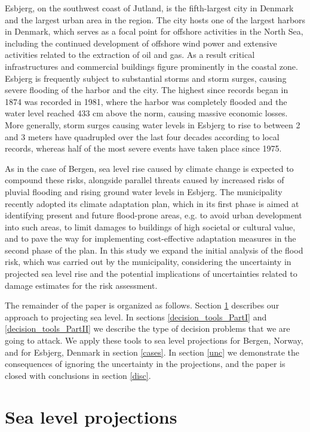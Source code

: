 \documentclass[note,screen,british,11pt]{nrdoc}
\begin{document}
Esbjerg, on the southwest coast of Jutland, is the fifth-largest city in Denmark and the largest urban area in the region. The city hosts one of the largest harbors  in Denmark, which serves as a focal point for offshore activities in the North Sea, including the continued development of offshore wind power and extensive activities related to the extraction of oil and gas. As a result critical infrastructures and commercial buildings figure prominently in the coastal zone. Esbjerg is frequently subject to substantial storms and storm surges, causing severe flooding of the harbor and the city. The highest since records began in 1874 was recorded in 1981, where the harbor was completely flooded and the water level reached  433 cm above the norm, causing massive economic losses.  More generally, storm surges causing water levels in Esbjerg to rise to between 2 and 3 meters have quadrupled over the last four decades according to local records, whereas half of the most severe events have taken place since 1975.

As in the case of Bergen, sea level rise caused by climate change is expected to compound these risks, alongside parallel threats caused by increased risks of pluvial flooding and rising ground water levels in Esbjerg. The municipality recently adopted its climate adaptation plan, which in its first phase is aimed at identifying present and future flood-prone areas, e.g. to avoid urban development into such areas, to limit damages to buildings of high societal or cultural value, and to pave the way for implementing cost-effective adaptation measures in the second phase of the plan. In this study we expand the initial analysis of the flood risk, which was carried out by the municipality, considering the uncertainty in projected sea level rise and the potential implications of uncertainties related to damage estimates for the risk assessment.  

The remainder of the paper is organized as follows. Section \ref{sealevelproj} describes our approach to projecting sea level. In sections \ref{decision_tools_PartI} and \ref{decision_tools_PartII} we describe the type of decision problems that we are going to attack. We apply these tools to sea level projections for Bergen, Norway, and for Esbjerg, Denmark in section \ref{cases}. In section \ref{unc} we demonstrate the consequences of ignoring the uncertainty in the projections, and the paper is closed with conclusions in section \ref{disc}.

\section{Sea level projections}
\label{sealevelproj}
\end{document}
